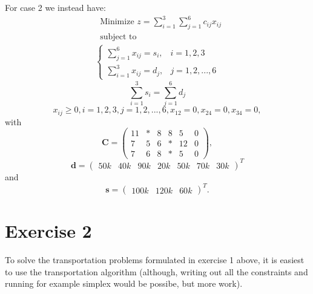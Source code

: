 \documentclass{article}
\begin{document}
  \noindent
  For case 2 we instead have:
   \begin{align*}
  & \text{Minimize } z = \sum_{i=1}^{3}\sum_{j=1}^6 c_{ij}x_{ij} \\
  & \text{subject to}
    \label{eq17}
  \end{align*}
  \begin{align}
    \begin{cases}
      \sum_{j=1}^{6} x_{ij} = s_{i}, & i = 1, 2, 3 \\
      \sum_{i=1}^{3} x_{ij} = d_{j}, & j = 1, 2, ..., 6
    \end{cases}
  \end{align}
  \begin{equation}
    \sum_{i=1}^{3} s_{i} = \sum_{j=1}^6 d_{j}
    \label{eq19}
  \end{equation}
  \begin{equation}
    x_{ij} \geq 0, i = 1, 2, 3, j = 1, 2, ..., 6, x_{12} = 0, x_{24} = 0, x_{34} = 0,
    \label{eq20}
  \end{equation}
  with
  \begin{equation}
    \mathbf{C} = 
    \begin{pmatrix}
      11 & * & 8 & 8  & 5  & 0\\
      7  & 5 & 6 & *  & 12 & 0\\
      7  & 6 & 8 & *  & 5  & 0
    \end{pmatrix},
    \label{eq21}
  \end{equation}
  \begin{equation}
    \mathbf{d} =
    \begin{pmatrix}
      50k & 40k & 90k & 20k & 50k & 70k & 30k
    \end{pmatrix}^T
    \label{eq22}
  \end{equation}
  and
  \begin{equation}
    \mathbf{s} =
    \begin{pmatrix}
      100k & 120k & 60k
    \end{pmatrix}^T.
    \label{eq23}
  \end{equation}

  \section*{Exercise 2}
  To solve the transportation problems formulated in exercise 1 above, it is easiest to use the transportation algorithm (although, writing out all the constraints and running for example simplex would be possibe, but more work).
\end{document}
